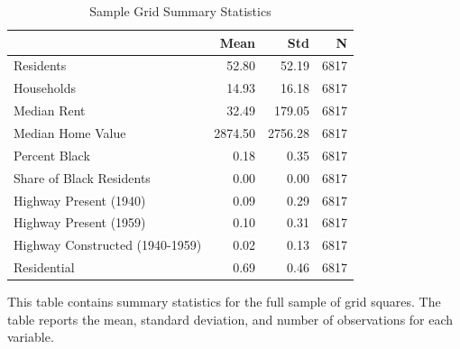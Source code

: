 \begin{table}[h]
\centering
\caption{Sample Grid Summary Statistics}
\label{tab:summary_stats}
\begin{threeparttable}
\begin{tabular*}{1.0\textwidth}{@{\extracolsep{\fill}}l*{3}{r}}
\toprule
 & Mean & Std & N \\
\midrule
Residents & 52.80 & 52.19 & 6817 \\
Households & 14.93 & 16.18 & 6817 \\
Median Rent & 32.49 & 179.05 & 6817 \\
Median Home Value & 2874.50 & 2756.28 & 6817 \\
Percent Black & 0.18 & 0.35 & 6817 \\
Share of Black Residents & 0.00 & 0.00 & 6817 \\
Highway Present (1940) & 0.09 & 0.29 & 6817 \\
Highway Present (1959) & 0.10 & 0.31 & 6817 \\
Highway Constructed (1940-1959) & 0.02 & 0.13 & 6817 \\
Residential & 0.69 & 0.46 & 6817 \\
\bottomrule
\end{tabular*}
\begin{tablenotes}[flushleft]
\footnotesize
\item This table contains summary statistics for the full sample of grid squares. The table reports the mean, standard deviation, and number of observations for each variable.
\end{tablenotes}
\end{threeparttable}
\end{table}
